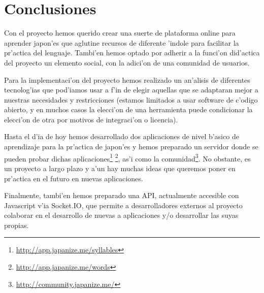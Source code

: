 \section{Conclusiones}
\label{sec:conclusiones}

Con el proyecto \Nipponline{} hemos querido crear una suerte de plataforma online para aprender japon'es que aglutine 
recursos de diferente 'indole para facilitar la pr'actica del lenguaje. Tambi'en hemos optado por adherir a la funci'on 
did'actica del proyecto un elemento social, con la adici'on de una comunidad de usuarios.

Para la implementaci'on del proyecto hemos realizado un an'alisis de diferentes tecnolog'ias que pod'iamos usar a f'in de 
elegir aquellas que se adaptaran mejor a nuestras necesidades y restricciones (estamos limitados a usar software de 
c'odigo abierto, y en muchos casos la elecci'on de una herramienta puede condicionar la elecci'on de otra por motivos de 
integraci'on o licencia).

Hasta el d'ia de hoy hemos desarrollado dos aplicaciones de nivel b'asico de aprendizaje para la pr'actica de japon'es y 
hemos preparado un servidor donde se pueden probar dichas 
aplicaciones\footnote{\url{http://app.japanize.me/syllables}} \footnote{\url{http://app.japanize.me/words}}, as'i como 
la comunidad\footnote{\url{http://community.japanize.me/}}. No obstante, \Nipponline{} es un proyecto a largo plazo y 
a'un hay muchas ideas que queremos poner en pr'actica en el futuro en nuevas aplicaciones.

Finalmente, tambi'en hemos preparado una API, actualmente accesible con Javascript v'ia Socket.IO, que permite a 
desarrolladores externos al proyecto colaborar en el desarrollo de nuevas a aplicaciones y/o desarrollar las suyas 
propias.
